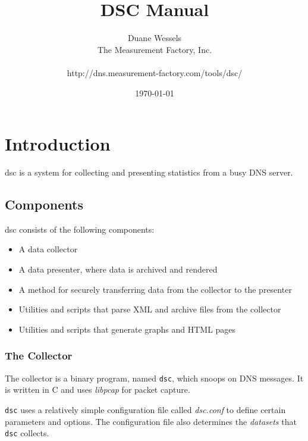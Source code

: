 \documentclass{report}
\def\dsc{{\sc dsc}}
\begin{document}
\begin{titlepage}
\title{DSC Manual}
\author{Duane Wessels\\
The Measurement Factory, Inc.\\
\\
http://dns.measurement-factory.com/tools/dsc/}
\date{\today}
\end{titlepage}

\maketitle
\tableofcontents

\chapter{Introduction}

{\dsc} is a system for collecting and presenting statistics from
a busy DNS server.  

\section{Components}

{\dsc} consists of the following components:
\begin{itemize}
\item A data collector
\item A data presenter, where data is archived and rendered
\item A method for securely transferring data from the collector
	to the presenter
\item Utilities and scripts that parse XML and archive files from the collector
\item Utilities and scripts that generate graphs and HTML pages
\end{itemize}

\subsection{The Collector}

The collector is a binary program, named {\tt dsc\/}, which snoops
on DNS messages.  It is written in C and uses {\em libpcap\/} for
packet capture.

{\tt dsc\/} uses a relatively simple configuration file called {\em
dsc.conf\/} to define certain parameters and options.  The configuration
file also determines the {\em datasets\/} that {\tt dsc\/} collects.
\end{document}
